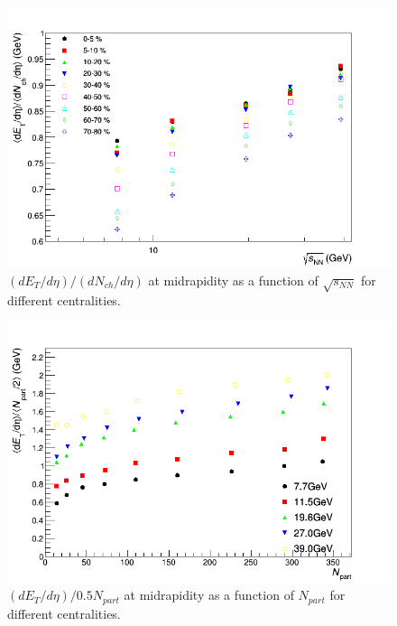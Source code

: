	\begin{figure}[h]
	  \centering
	  \includegraphics[width=5.5in]{figures/finalStacked/dETdEtaOverdNchdEtaSumCent8s.png}
	  \caption{$(dE_{T}/d\eta)/(dN_{ch}/d\eta)$ at midrapidity as a function of $\sqrt{s_{NN}}$ for different centralities.}\label{fig:dETdEtaOverdNchdEtaSumCents}
	\end{figure}
	
	\begin{figure}[h]
	  \centering
	  \includegraphics[width=5.5in]{figures/finalStacked/dETdEtaOverNpartBy2SumEn39.0s.png}
	  \caption{$(dE_{T}/d\eta)/0.5N_{part}$ at midrapidity as a function of ${N_{part}}$ for different centralities.}\label{fig:dETdEtaOverNpartBy2SumEn}
	\end{figure}
	
